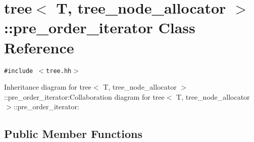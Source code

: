 \hypertarget{classtree_1_1pre__order__iterator}{
\section{tree$<$ T, tree\_\-node\_\-allocator $>$::pre\_\-order\_\-iterator Class Reference}
\label{classtree_1_1pre__order__iterator}
}
{\tt \#include $<$tree.hh$>$}

Inheritance diagram for tree$<$ T, tree\_\-node\_\-allocator $>$::pre\_\-order\_\-iterator:Collaboration diagram for tree$<$ T, tree\_\-node\_\-allocator $>$::pre\_\-order\_\-iterator:\subsection*{Public Member Functions}
